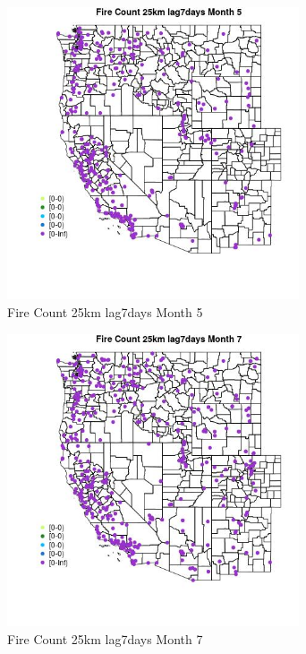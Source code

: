 \begin{figure} 
\centering  
\includegraphics[width=0.77\textwidth]{Code_Outputs/Report_ML_input_PM25_Step4_part_e_de_duplicated_aves_compiled_2019-05-18wNAs_MapObsMo5Fire_Count_25km_lag7days.jpg} 
\caption{\label{fig:Report_ML_input_PM25_Step4_part_e_de_duplicated_aves_compiled_2019-05-18wNAsMapObsMo5Fire_Count_25km_lag7days}Fire Count 25km lag7days Month 5} 
\end{figure} 
 

\begin{figure} 
\centering  
\includegraphics[width=0.77\textwidth]{Code_Outputs/Report_ML_input_PM25_Step4_part_e_de_duplicated_aves_compiled_2019-05-18wNAs_MapObsMo7Fire_Count_25km_lag7days.jpg} 
\caption{\label{fig:Report_ML_input_PM25_Step4_part_e_de_duplicated_aves_compiled_2019-05-18wNAsMapObsMo7Fire_Count_25km_lag7days}Fire Count 25km lag7days Month 7} 
\end{figure} 
 

